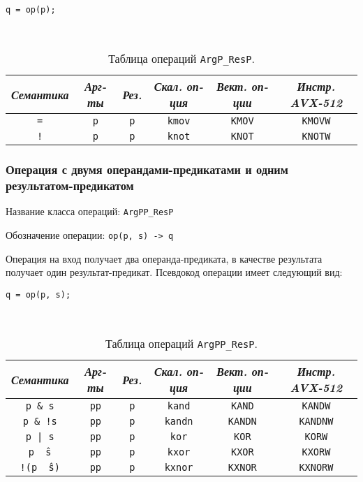 \documentclass[a4paper,12pt]{extarticle}                     %
\numberwithin{equation}{section}                             %
\numberwithin{figure}{section}                               %
\numberwithin{table}{section}                                %
\theoremstyle{plain}                                         %
\numberwithin{theorem}{section}                              %
\numberwithin{lemma}{section}                                %
\numberwithin{definition}{section}                           %
\begin{document}
\begin{lstlisting}[caption={Псевдокод операции ArgP\_ResP.}]
q = op(p);
\end{lstlisting}

\

\begin{table}[!h]
\setcaptionmargin{0mm}
\onelinecaptionsfalse
{}
\caption{Таблица операций \texttt{ArgP\_ResP}.}
\bigskip
\begin{tabular}{|c|c|c|c|c|c|}
\hline
\textit{Семантика} & \textit{Арг-ты} & \textit{Рез.} & \textit{Скал. оп-ция} & \textit{Вект. оп-ции} & \textit{Инстр. AVX-512} \\
\hline
\texttt{=} & \texttt{p} & \texttt{p} & \texttt{kmov} & \texttt{KMOV} & \texttt{KMOVW} \\
\texttt{!} & \texttt{p} & \texttt{p} & \texttt{knot} & \texttt{KNOT} & \texttt{KNOTW} \\
\hline
\end{tabular}
\end{table}

\newpage

\subsubsection{Операция с двумя операндами-предикатами и одним результатом-предикатом}

Название класса операций: \texttt{ArgPP\_ResP}

Обозначение операции: \texttt{op(p, s) -> q}

Операция на вход получает два операнда-предиката, в качестве результата получает один результат-предикат. Псевдокод операции имеет следующий вид:

\begin{lstlisting}[caption={Псевдокод операции ArgPP\_ResP.}]
q = op(p, s);
\end{lstlisting}

\

\begin{table}[!h]
\setcaptionmargin{0mm}
\onelinecaptionsfalse
{}
\caption{Таблица операций \texttt{ArgPP\_ResP}.}
\bigskip
\begin{tabular}{|c|c|c|c|c|c|}
\hline
\textit{Семантика} & \textit{Арг-ты} & \textit{Рез.} & \textit{Скал. оп-ция} & \textit{Вект. оп-ции} & \textit{Инстр. AVX-512} \\
\hline
\texttt{p \& s}      & \texttt{pp} & \texttt{p} & \texttt{kand}   & \texttt{KAND}   & \texttt{KANDW} \\
\texttt{p \& !s}     & \texttt{pp} & \texttt{p} & \texttt{kandn}  & \texttt{KANDN}  & \texttt{KANDNW} \\
\texttt{p | s}       & \texttt{pp} & \texttt{p} & \texttt{kor}    & \texttt{KOR}    & \texttt{KORW} \\
\texttt{p \^ \ s}    & \texttt{pp} & \texttt{p} & \texttt{kxor}   & \texttt{KXOR}   & \texttt{KXORW} \\
\texttt{!(p \^ \ s)} & \texttt{pp} & \texttt{p} & \texttt{kxnor}  & \texttt{KXNOR}  & \texttt{KXNORW} \\
\hline
\end{tabular}
\end{table}
\end{document}
